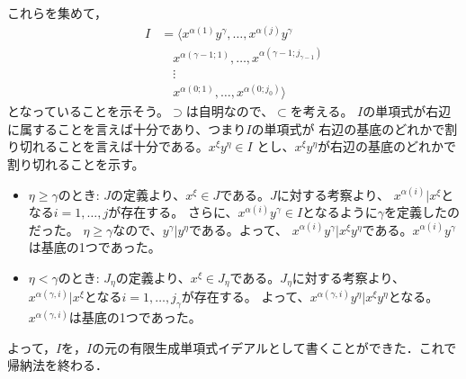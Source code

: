 \begin{myproof}
これらを集めて，
\begin{align}
 I &= \langle x^{\alpha(1)}y^\gamma ,\dots, x^{\alpha(j)}y^\gamma \\
 &\quad x^{\alpha(\gamma-1;1)},\dots, x^{\alpha(\gamma-1;j_{\gamma-1})} \\
 &\quad \vdots\\
 & \quad x^{\alpha(0;1)} ,\dots, x^{\alpha(0;j_{0})} \rangle
\end{align}
となっていることを示そう。$\supset$は自明なので、$\subset$を考える。
$I$の単項式が右辺に属することを言えば十分であり、つまり$I$の単項式が
右辺の基底のどれかで割り切れることを言えば十分である。$x^{\xi}y^\eta\in I$
とし、$x^\xi y^\eta$が右辺の基底のどれかで割り切れることを示す。
\begin{itemize}
  \item $\eta \ge \gamma$のとき:
  $J$の定義より、$x^\xi \in J$である。$J$に対する考察より、
  $x^{\alpha(i)}|x^\xi$となる$i=1,\dots,j$が存在する。
  さらに、$x^{\alpha(i)}y^\gamma \in I$となるように$\gamma$を定義したのだった。
  $\eta \ge \gamma$なので、$y^\gamma | y^\eta$である。よって、
  $x^{\alpha(i)}y^\gamma | x^\xi y^\eta$である。$x^{\alpha(i)}y^\gamma$は基底の1つであった。
  \item $\eta < \gamma$のとき:
  $J_\eta$の定義より、$x^\xi \in J_\eta$である。$J_\eta$に対する考察より、
  $x^{\alpha(\gamma,i)} | x^\xi $となる$i=1,\dots, j_\gamma$が存在する。
  よって、$x^{\alpha(\gamma,i)}y^\eta | x^\xi y^\eta$となる。$x^{\alpha(\gamma,i)}$は基底の1つであった。
  \end{itemize}
よって，$I$を，$I$の元の有限生成単項式イデアルとして書くことができた．これで帰納法を終わる．


\end{myproof}
